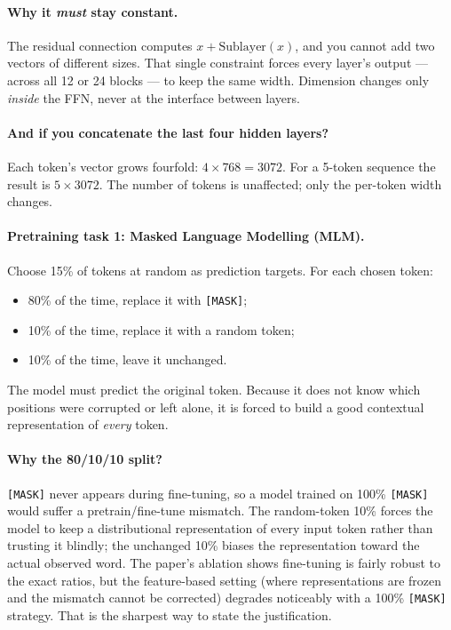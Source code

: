 \documentclass[11pt,a4paper]{article}
\begin{document}
\paragraph{Why it \emph{must} stay constant.} The residual connection computes
$x + \mathrm{Sublayer}(x)$, and you cannot add two vectors of different sizes. That single
constraint forces every layer's output --- across all 12 or 24 blocks --- to keep the same
width. Dimension changes only \emph{inside} the FFN, never at the interface between layers.

\paragraph{And if you concatenate the last four hidden layers?} Each token's vector grows
fourfold: $4 \times 768 = 3072$. For a 5-token sequence the result is $5 \times 3072$. The
number of tokens is unaffected; only the per-token width changes.

\paragraph{Pretraining task 1: Masked Language Modelling (MLM).} Choose 15\% of tokens at
random as prediction targets. For each chosen token:
\begin{itemize}
\item 80\% of the time, replace it with \texttt{[MASK]};
\item 10\% of the time, replace it with a random token;
\item 10\% of the time, leave it unchanged.
\end{itemize}
The model must predict the original token. Because it does not know which positions were
corrupted or left alone, it is forced to build a good contextual representation of
\emph{every} token.

\paragraph{Why the 80/10/10 split?} \texttt{[MASK]} never appears during fine-tuning, so a
model trained on 100\% \texttt{[MASK]} would suffer a pretrain/fine-tune mismatch. The
random-token 10\% forces the model to keep a distributional representation of every input
token rather than trusting it blindly; the unchanged 10\% biases the representation toward
the actual observed word. The paper's ablation shows fine-tuning is fairly robust to the
exact ratios, but the feature-based setting (where representations are frozen and the
mismatch cannot be corrected) degrades noticeably with a 100\% \texttt{[MASK]} strategy.
That is the sharpest way to state the justification.
\end{document}
